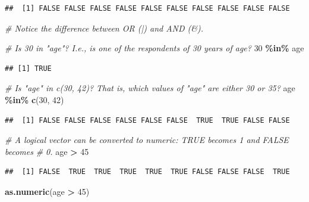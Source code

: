 \documentclass[
]{book}
\newenvironment{Shaded}{\begin{snugshade}}{\end{snugshade}}
\newcommand{\CommentTok}[1]{\textcolor[rgb]{0.56,0.35,0.01}{\textit{#1}}}
\newcommand{\DecValTok}[1]{\textcolor[rgb]{0.00,0.00,0.81}{#1}}
\newcommand{\FunctionTok}[1]{\textcolor[rgb]{0.13,0.29,0.53}{\textbf{#1}}}
\newcommand{\NormalTok}[1]{#1}
\newcommand{\SpecialCharTok}[1]{\textcolor[rgb]{0.81,0.36,0.00}{\textbf{#1}}}
\begin{document}
\begin{verbatim}
##  [1] FALSE FALSE FALSE FALSE FALSE FALSE FALSE FALSE FALSE FALSE
\end{verbatim}

\begin{Shaded}
\begin{Highlighting}[]
\CommentTok{\# Notice the difference between OR (|) and AND (\&).}

\CommentTok{\# Is 30 in "age"? I.e., is one of the respondents of 30 years of age?}
\DecValTok{30} \SpecialCharTok{\%in\%}\NormalTok{ age}
\end{Highlighting}
\end{Shaded}

\begin{verbatim}
## [1] TRUE
\end{verbatim}

\begin{Shaded}
\begin{Highlighting}[]
\CommentTok{\# Is "age" in c(30, 42)? That is, which values of "age" are either 30 or 35?}
\NormalTok{age }\SpecialCharTok{\%in\%} \FunctionTok{c}\NormalTok{(}\DecValTok{30}\NormalTok{, }\DecValTok{42}\NormalTok{)}
\end{Highlighting}
\end{Shaded}

\begin{verbatim}
##  [1] FALSE FALSE FALSE FALSE FALSE FALSE  TRUE  TRUE FALSE FALSE
\end{verbatim}

\begin{Shaded}
\begin{Highlighting}[]
\CommentTok{\# A logical vector can be converted to numeric: TRUE becomes 1 and FALSE becomes}
\CommentTok{\# 0.}
\NormalTok{age }\SpecialCharTok{\textgreater{}} \DecValTok{45}
\end{Highlighting}
\end{Shaded}

\begin{verbatim}
##  [1] FALSE  TRUE  TRUE  TRUE  TRUE  TRUE FALSE FALSE FALSE  TRUE
\end{verbatim}

\begin{Shaded}
\begin{Highlighting}[]
\FunctionTok{as.numeric}\NormalTok{(age }\SpecialCharTok{\textgreater{}} \DecValTok{45}\NormalTok{)}
\end{Highlighting}
\end{Shaded}
\end{document}
